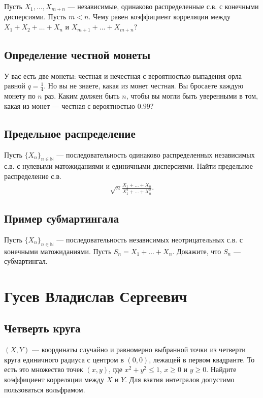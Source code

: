 \documentclass[12pt]{article}
\newcommand\N{\mathbb{N}}
\begin{document}
Пусть $X_1, \dots, X_{m + n}$ --- независимые, одинаково распределенные с.в. с конечными дисперсиями. Пусть $m < n$. Чему равен коэффициент корреляции между $X_1 + X_2 + \dots + X_n$ и $X_{m + 1} + \dots + X_{m + n}$?

\subsection{Определение честной монеты}

У вас есть две монеты: честная и нечестная с вероятностью выпадения орла равной $q = \frac{1}{4}$. Но вы не знаете, какая из монет честная. Вы бросаете каждую монету по $n$ раз. Каким должен быть $n$, чтобы вы могли быть уверенными в том, какая из монет --- честная с вероятностью $0.99$? 


\subsection{Предельное распределение}

Пусть $\{X_n\}_{n \in \N}$ --- последовательность одинаково распределенных независимых с.в. с нулевыми матожиданиями и единичными дисперсиями. Найти предельное распределение с.в.
\begin{align*}
    \sqrt{n}\frac{X_1 + \dots + X_n}{X_1^2 + \dots + X_n^2}.
\end{align*}

\subsection{Пример субмартингала}

Пусть $\{X_n\}_{n \in \N}$ --- последовательность независимых неотрицательных с.в. с конечными матожиданиями. Пусть $S_n = X_1 + \dots + X_n$. Докажите, что $S_n$ --- субмартингал.

\newpage
\section{Гусев Владислав Сергеевич}

\subsection{Четверть круга}

$(X, Y)$ --- координаты случайно и равномерно выбранной точки из четверти круга единичного радиуса с центром в $(0, 0)$, лежащей в первом квадранте. То есть это множество точек $(x, y)$, где $x^2 + y^2 \le 1$, $x \ge 0$ и $y \ge 0$. Найдите коэффициент корреляции между $X$ и $Y$. Для взятия интегралов  допустимо пользоваться вольфрамом.
\end{document}
